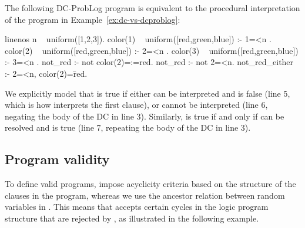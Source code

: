 \begin{example}
	The following DC-ProbLog program is equivalent to the procedural interpretation of the program in  Example~\ref{ex:dc-vs-dcproblog}:
	\begin{problog*}{linenos}
n ~ uniform([1,2,3]).
color(1) ~ uniform([red,green,blue]) :- 1=<n .
color(2) ~ uniform([red,green,blue]) :- 2=<n .
color(3) ~ uniform([red,green,blue]) :- 3=<n .
not_red :- not color(2)=:=red.     
not_red :- not 2=<n.               
not_red_either :- 2=<n, color(2)=\=red.
	\end{problog*}
	We explicitly model that  is true if either  can be interpreted and  is false (line 5, which is how \dcproblogsty interprets the first clause), or  cannot be interpreted (line 6, negating the body of the DC in line 3). Similarly,  is true if and only if  can be resolved and  is true (line 7, repeating the body of the DC in line 3).
\end{example}


\subsection{Program validity}
To define valid programs, \citet{gutmann2011magic} impose acyclicity criteria based on the structure of the clauses in the program, whereas we use the ancestor relation between random variables in \dcproblogsty. This means that \dcproblogsty accepts certain cycles in the logic program structure that are rejected by \dcsty, as illustrated in the following example. 

